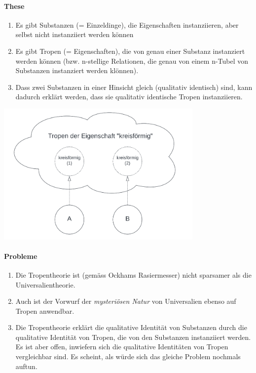 \documentclass[../main.tex]{subfiles}
\begin{document}
\paragraph{These} 
\begin{enumerate}[label=(\alph*)]
	\item Es gibt Substanzen (= Einzeldinge), die Eigenschaften instanziieren, aber selbst nicht instanziiert werden können
	\item Es gibt Tropen (= Eigenschaften), die von genau einer Substanz instanziert werden können (bzw. n-stellige Relationen, die genau von einem n-Tubel von Substanzen instanziert werden klönnen).
	\item Dass zwei Substanzen in einer Hinsicht gleich (qualitativ identisch) sind, kann dadurch erklärt werden, dass sie qualitativ identische Tropen instanziieren. 
\end{enumerate}

{\centering\includegraphics[height=7cm]{images/tropen_uebersicht.png}\endcenter}

\paragraph{Probleme}
\begin{enumerate}
	\item Die Tropentheorie ist (gemäss Ockhams Rasiermesser) nicht sparsamer als die Universalientheorie.
	\item Auch ist der Vorwurf der \textit{mysteriösen Natur} von Universalien ebenso auf Tropen anwendbar. 
	\item Die Tropentheorie erklärt die qualitative Identität von Substanzen durch die qualitative Identität von Tropen, die von den Substanzen instanziiert werden. Es ist aber offen, inwiefern sich die qualitative Identitäten von Tropen vergleichbar sind. Es scheint, als würde sich das gleiche Problem nochmals auftun. 
\end{enumerate}
\end{document}
